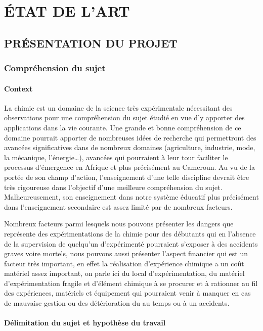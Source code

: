 \part{ÉTAT DE L’ART}
\chapter{PRÉSENTATION DU PROJET}

\section{Compréhension du sujet}

\subsection{Context}

La chimie est un domaine de la science très expérimentale nécessitant des observations pour une compréhension du sujet étudié en vue d’y apporter des applications dans la vie courante. Une grande et bonne compréhension de ce domaine pourrait apporter de nombreuses idées de recherche qui permettront des avancées significatives dans de nombreux domaines (agriculture, industrie, mode, la mécanique, l'énergie…), avancées qui pourraient à leur tour faciliter le processus d'émergence en Afrique et plus précisément au Cameroun. Au vu de la portée de son champ d’action, l'enseignement d’une telle discipline devrait être très rigoureuse dans l’objectif d’une meilleure compréhension du sujet. Malheureusement, son enseignement dans notre système éducatif plus précisément dans l’enseignement secondaire est assez limité par de nombreux facteurs. 

Nombreux facteurs parmi lesquels nous pouvons présenter les dangers que représente des expérimentations de la chimie pour des débutants qui en l’absence de la supervision de quelqu’un d'expérimenté pourraient s’exposer à des accidents graves voire mortels, nous pouvons aussi présenter l’aspect financier qui est un facteur très important, en effet la réalisation d'expérience chimique a un coût matériel assez important, on parle ici du local d'expérimentation, du matériel d'expérimentation fragile et d'élément chimique à se procurer et à rationner au fil des expériences, matériels et équipement qui pourraient venir à manquer en cas de mauvaise gestion ou des détérioration du au temps ou à un accidents. 

\subsection{Délimitation du sujet et hypothèse du travail}

\lipsum[1]




